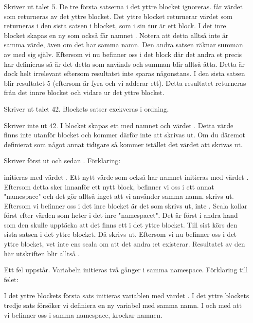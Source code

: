 \SubtaskSolved  Skriver ut talet 5. De tre första satserna i det yttre blocket ignoreras.  får värdet som returneras av det yttre blocket. Det yttre blocket returnerar värdet som returneras i den sista satsen i blocket, som i sin tur är ett block. I det inre blocket skapas en ny  som också får namnet . Notera att detta alltså inte är samma värde, även om det har samma namn. Den andra satsen räknar summan av  med sig själv. Eftersom vi nu befinner oss i det block där det andra et precis har definieras så är det detta  som används och summan blir alltså åtta. Detta är dock helt irrelevant eftersom resultatet inte sparas någonstans. I den sista satsen blir resultatet 5 (eftersom  är fyra och vi adderar ett). Detta resultatet returneras från det innre blocket och vidare ur det yttre blocket.

\SubtaskSolved  Skriver ut talet 42. Blockets satser exekveras i ordning.

\SubtaskSolved  Skriver inte ut 42. I blocket skapas ett  med namnet  och värdet . Detta värde finns inte utanför blocket och kommer därför inte att skrivas ut. Om du däremot definierat  som något annat tidigare så kommer istället det värdet att skrivas ut.

\SubtaskSolved  Skriver först ut  och sedan . Förklaring:

 initieras med värdet . Ett nytt värde som också har namnet  initieras med värdet . Eftersom detta sker innanför ett nytt block, befinner vi oss i ett annat "namespace" och det gör alltså inget att vi använder samma namn.  skrivs ut. Eftersom vi befinner oss i det inre blocket är det  som skrivs ut, inte . Scala kollar först efter värden som heter  i det inre "namespacet". Det är först i andra hand som den skulle upptäcka att det finns ett  i det yttre blocket. Till sist körs den sista satsen i det yttre blocket. Då skrivs  ut. Eftersom vi nu befinner oss i det yttre blocket, vet inte ens scala om att det andra :et existerar. Resultatet av den här utskriften blir alltså .

\SubtaskSolved  Ett fel uppstår. Variabeln  initieras två gånger i samma namespace. Förklaring till felet:

I det yttre blockets första sats initieras variablen  med värdet . I det yttre blockets tredje sats försöker vi definiera en ny variabel med samma namn. I och med att vi befinner oss i samma namespace, krockar namnen.

